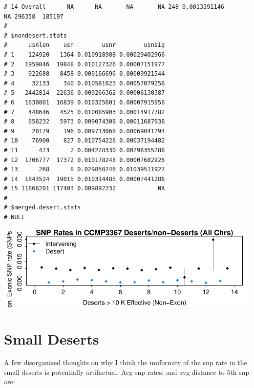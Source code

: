 \documentclass{article}\usepackage[]{graphicx}\usepackage[]{color}
\makeatletter
\newenvironment{kframe}{%
 \def\at@end@of@kframe{}%
 \ifinner\ifhmode%
  \def\at@end@of@kframe{\end{minipage}}%
  \begin{minipage}{\columnwidth}%
 \fi\fi%
 \def\FrameCommand##1{\hskip\@totalleftmargin \hskip-\fboxsep
 \colorbox{shadecolor}{##1}\hskip-\fboxsep
     \hskip-\linewidth \hskip-\@totalleftmargin \hskip\columnwidth}%
 \MakeFramed {\advance\hsize-\width
   \@totalleftmargin\z@ \linewidth\hsize
   \@setminipage}}%
 {\par\unskip\endMakeFramed%
 \at@end@of@kframe}
\newenvironment{knitrout}{}{} %
\makeatother
\begin{document}
\begin{knitrout}
\begin{kframe}
\begin{verbatim}
# 14 Overall      NA      NA       NA       NA 248 0.0013391146           NA 296358  185197
# 
# $nondesert.stats
#      usnlen    usn        usnr        usnsig
# 1    124920   1364 0.010918988 0.00029402966
# 2   1959846  19848 0.010127326 0.00007151977
# 3    922688   8458 0.009166696 0.00009921544
# 4     32133    340 0.010581023 0.00057079256
# 5   2442814  22636 0.009266362 0.00006130387
# 6   1630801  16839 0.010325601 0.00007915956
# 7    448646   4525 0.010085903 0.00014917782
# 8    658232   5973 0.009074308 0.00011687936
# 9     20179    196 0.009713068 0.00069041294
# 10    76900    827 0.010754226 0.00037194482
# 11      473      2 0.004228330 0.00298355288
# 12  1706777  17372 0.010178248 0.00007682926
# 13      268      8 0.029850746 0.01039511927
# 14  1843524  19015 0.010314485 0.00007441286
# 15 11868201 117403 0.009892232            NA
# 
# $merged.desert.stats
# NULL
\end{verbatim}
\end{kframe}
\end{knitrout}

\includegraphics{figs-mine/bigdes-snpdens-nc-it.pdf}


\section{Small Deserts}
\label{sec:small-deserts}

A few disorganized thoughts on why I think the uniformity of the snp rate in the small deserts is potentially artifactual.  Avg snp rates, and avg distance to 5th snp are: 
\end{document}
